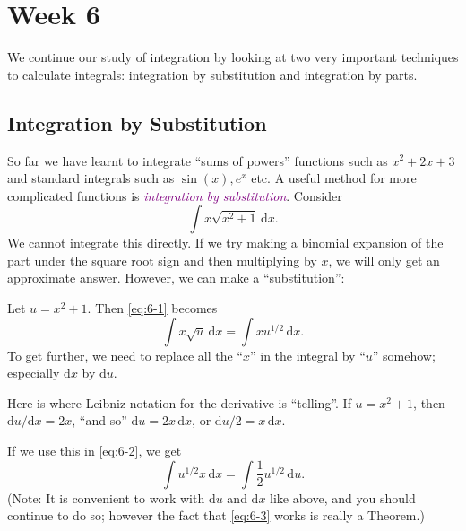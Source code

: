\documentclass[
  english,
  11pt,
  oneside]{book}
\newcommand{\slide}{}
\theoremstyle{definition}
\theoremstyle{definition}
\theoremstyle{definition}
\theoremstyle{definition}
\theoremstyle{remark}
\begin{document}
\chapter{Week 6}\label{week-six}

We continue our study of integration by looking at two very important techniques to calculate integrals: integration by substitution and integration by parts.

\slide

\section{Integration by Substitution}\label{integration-by-substitution}

So far we have learnt to integrate ``sums of powers'' functions such as \(x^2 + 2x + 3\) and standard integrals such as \(\sin(x), e^x\) etc. A useful method for more complicated functions is \textcolor{purple}{\em integration by substitution}. Consider
\begin{equation}
\int x\sqrt{x^2+1} \,\mathrm{d}x.
\label{eq:6-1}
\end{equation}
We cannot integrate this directly. If we try making a binomial expansion of the part under the square root sign and then multiplying by \(x\), we will only get an approximate answer. However, we can make a ``substitution'':

\slide

Let \(u = x^2+ 1\). Then \eqref{eq:6-1} becomes
\begin{equation}
\int x\sqrt{u}\,\mathrm{d}x=\int xu^{1/2}\,\mathrm{d}x.
\label{eq:6-2}
\end{equation}
To get further, we need to replace all the ``\(x\)'' in the integral by ``\(u\)'' somehow; especially \(\mathrm{d}x\) by \(\mathrm{d}u\).

Here is where Leibniz notation for the derivative is ``telling''.
If \(u = x^2+ 1\), then \(\mathrm{d}u/\mathrm{d}x = 2x\), ``and so'' \(\mathrm{d}u = 2x\,\mathrm{d}x\), or \(\mathrm{d}u/2 = x\,\mathrm{d}x\).

If we use this in \eqref{eq:6-2}, we get
\begin{equation}
\int u^{1/2}x\,\mathrm{d}x = \int\frac12u^{1/2}\,\mathrm{d}u.
\label{eq:6-3}
\end{equation}
(Note: It is convenient to work with \(\mathrm{d}u\) and \(\mathrm{d}x\) like above, and you should continue to do so; however the fact that \eqref{eq:6-3} works is really a Theorem.)
\end{document}
